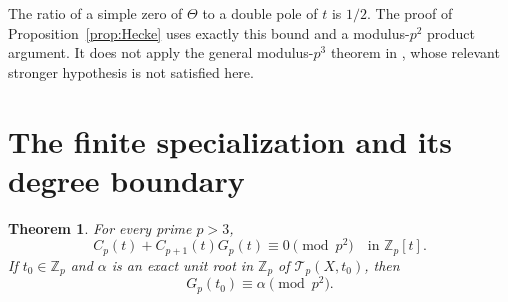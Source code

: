 \documentclass[11pt,a4paper]{article}
\newtheorem{theorem}{Theorem}[section]
\theoremstyle{remark}
\newcommand{\Z}{\mathbb Z}\newcommand{\Q}{\mathbb Q}
\newcommand{\Tp}{\mathcal T_p}
\begin{document}
The ratio of a simple zero of $\Theta$ to a double pole of $t$
is $1/2$. The proof of Proposition~\ref{prop:Hecke} uses exactly
this bound and a modulus-$p^2$ product argument. It does not apply
the general modulus-$p^3$ theorem in \cite[Section~5]{beukers},
whose relevant stronger hypothesis is not satisfied here.

\section{The finite specialization and its degree boundary}\label{sec:finite}
\begin{theorem}\label{thm:finite-specialization}
For every prime $p>3$,
\begin{equation}\label{eq:finite-polynomial}
 C_p(t)+C_{p+1}(t)G_p(t)\equiv0\pmod{p^2}
 \quad\text{in }\Z_p[t].
\end{equation}
If $t_0\in\Z_p$ and $\alpha$ is an exact unit root in $\Z_p$
of $\Tp(X,t_0)$, then
\begin{equation}\label{eq:unit-specialization}
 G_p(t_0)\equiv\alpha\pmod{p^2}.
\end{equation}
\end{theorem}
\end{document}
